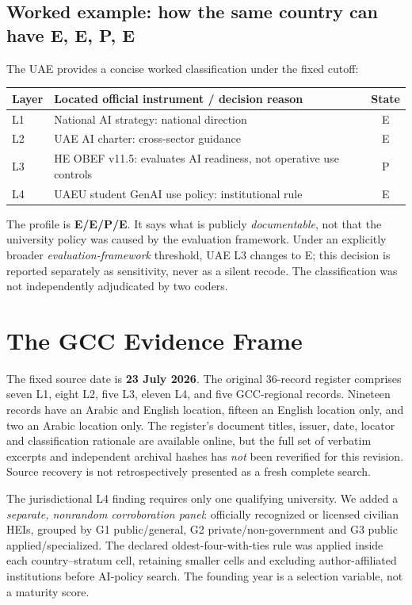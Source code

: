 \documentclass[conference,letterpaper]{IEEEtran}
\begin{document}
\subsection{Worked example: how the same country can have E, E, P, E}
The UAE provides a concise worked classification under the fixed cutoff:
\begin{center}
\small\setlength{\tabcolsep}{4pt}
\begin{tabularx}{\columnwidth}{@{}p{}Xc@{}}
\toprule
Layer & Located official instrument / decision reason & State\\\midrule
L1 & National AI strategy: national direction & E\\
L2 & UAE AI charter: cross-sector guidance & E\\
L3 & HE OBEF v11.5: evaluates AI readiness, not operative use controls~\cite{obef} & P\\
L4 & UAEU student GenAI use policy: institutional rule & E\\\bottomrule
\end{tabularx}
\end{center}
The profile is \textbf{E/E/P/E}. It says what is publicly \emph{documentable}, not that the university policy was caused by the evaluation framework. Under an explicitly broader \emph{evaluation-framework} threshold, UAE L3 changes to E; this decision is reported separately as sensitivity, never as a silent recode. The classification was not independently adjudicated by two coders.

\section{The GCC Evidence Frame}
The fixed source date is \textbf{23 July 2026}. The original 36-record register comprises seven L1, eight L2, five L3, eleven L4, and five GCC-regional records. Nineteen records have an Arabic and English location, fifteen an English location only, and two an Arabic location only. The register's document titles, issuer, date, locator and classification rationale are available online, but the full set of verbatim excerpts and independent archival hashes has \emph{not} been reverified for this revision. Source recovery is not retrospectively presented as a fresh complete search.

The jurisdictional L4 finding requires only one qualifying university. We added a \emph{separate, nonrandom corroboration panel}: officially recognized or licensed civilian HEIs, grouped by G1 public/general, G2 private/non-government and G3 public applied/specialized. The declared oldest-four-with-ties rule was applied inside each country--stratum cell, retaining smaller cells and excluding author-affiliated institutions before AI-policy search. The founding year is a selection variable, not a maturity score.
\end{document}
